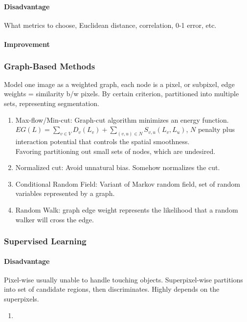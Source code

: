 \documentclass[10pt,a4paper]{article}
\begin{document}
\paragraph{Disadvantage}
What metrics to choose, Euclidean distance, correlation, 0-1 error, etc.
\paragraph{Improvement}

\subsubsection{Graph-Based Methods}
Model one image as a weighted graph, each node is a pixel, or subpixel, edge weights = similarity b/w pixels. By certain criterion, partitioned into multiple sets, representing segmentation.
\begin{enumerate}
	\item Max-flow/Min-cut: Graph-cut algorithm minimizes an energy function. $EG(L)=\sum_{v\in V}D_v(L_v)+\sum_{(v,u)\in N}S_{v,u}(L_v,L_u)$, $N$ penalty plus interaction potential that controls the spatial smoothness.\\
	Favoring partitioning out small sets of nodes, which are undesired.
	\item Normalized cut: Avoid unnatural bias. Somehow normalizes the cut.
	\item Conditional Random Field: Variant of Markov random field, set of random variables represented by a graph.
	\item Random Walk: graph edge weight represents the likelihood that a random walker will cross the edge.
\end{enumerate}

\subsubsection{Supervised Learning}

\paragraph{Disadvantage}Pixel-wise usually unable to handle touching objects. Superpixel-wise partitions into set of candidate regions, then discriminates. Highly depends on the superpixels.
\begin{enumerate}
	\item 
\end{enumerate}

\newpage



\end{document}
